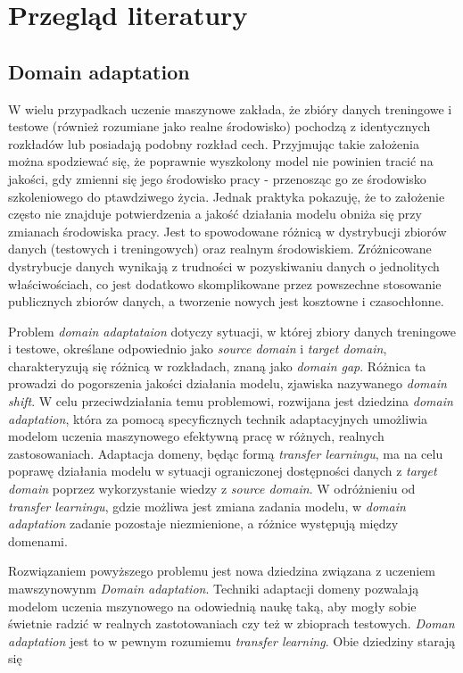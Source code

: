 
\chapter{Przegląd literatury}
    \justify  
    \section{Domain adaptation}
         W wielu przypadkach uczenie maszynowe zakłada, że zbióry danych treningowe i testowe (również rozumiane jako realne środowisko) pochodzą z identycznych rozkładów lub posiadają podobny rozkład cech. Przyjmując takie założenia można spodziewać się, że poprawnie wyszkolony model nie powinien tracić na jakości, gdy zmienni się jego środowisko pracy - przenosząc go ze środowisko szkoleniowego do ptawdziwego życia. Jednak praktyka pokazuję, że to założenie często nie znajduje potwierdzenia a jakość działania modelu obniża się przy zmianach środowiska pracy. Jest to spowodowane różnicą w dystrybucji zbiorów danych (testowych i treningowych) oraz realnym środowiskiem. Zróżnicowane dystrybucje danych wynikają z trudności w pozyskiwaniu danych o jednolitych właściwościach, co jest dodatkowo skomplikowane przez powszechne stosowanie publicznych zbiorów danych, a tworzenie nowych jest kosztowne i czasochłonne\cite{domain_adaptation_review}.
        \par
        Problem \textit{domain adaptataion} dotyczy sytuacji, w której zbiory danych treningowe i testowe, określane odpowiednio jako \textit{source domain} i \textit{target domain}, charakteryzują się różnicą w rozkładach, znaną jako \textit{domain gap}. Różnica ta prowadzi do pogorszenia jakości działania modelu, zjawiska nazywanego \textit{domain shift}. W celu przeciwdziałania temu problemowi, rozwijana jest dziedzina \textit{domain adaptation}, która za pomocą specyficznych technik adaptacyjnych umożliwia modelom uczenia maszynowego efektywną pracę w różnych, realnych zastosowaniach. Adaptacja domeny, będąc formą \textit{transfer learningu}, ma na celu poprawę działania modelu w sytuacji ograniczonej dostępności danych z \textit{target domain} poprzez wykorzystanie wiedzy z \textit{source domain}. W odróżnieniu od \textit{transfer learningu}, gdzie możliwa jest zmiana zadania modelu, w \textit{domain adaptation} zadanie pozostaje niezmienione, a różnice występują między domenami.
        \par 
        Rozwiązaniem powyższego problemu jest nowa dziedzina związana z uczeniem mawszynowynm \textit{Domain adaptation}. Techniki adaptacji domeny pozwalają modelom uczenia mszynowego na odowiednią naukę taką, aby mogły sobie świetnie radzić w realnych zastotowaniach czy też w zbioprach testowych. \textit{Doman adaptation} jest to w pewnym rozumiemu \textit{transfer learning}\cite{transfer_learning}. Obie dziedziny starają się
